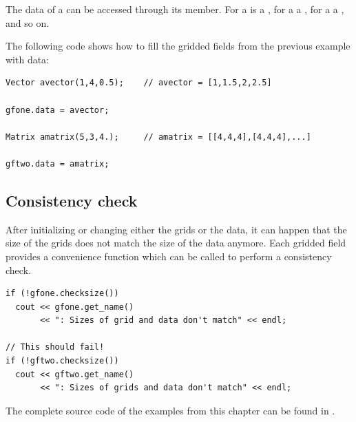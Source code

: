 The data of a  can be accessed through its  member.
For a   is a , for a  a , for a  a , and so on.

The following code shows how to fill the gridded fields from the previous example with data:

\begin{lstlisting}
Vector avector(1,4,0.5);    // avector = [1,1.5,2,2.5]

gfone.data = avector;

Matrix amatrix(5,3,4.);     // amatrix = [[4,4,4],[4,4,4],...]

gftwo.data = amatrix;
\end{lstlisting}

\subsection{Consistency check}
\label{sec:griddedfields:consistency}

After initializing or changing either the grids or the data, it can happen
that the size of the grids does not match the size of the data anymore. Each
gridded field provides a convenience function which can be called to perform a
consistency check.

\begin{lstlisting}
if (!gfone.checksize())
  cout << gfone.get_name()
       << ": Sizes of grid and data don't match" << endl;

// This should fail!
if (!gftwo.checksize())
  cout << gftwo.get_name()
       << ": Sizes of grids and data don't match" << endl;
\end{lstlisting}

The complete source code of the examples from this chapter can be found in
.


